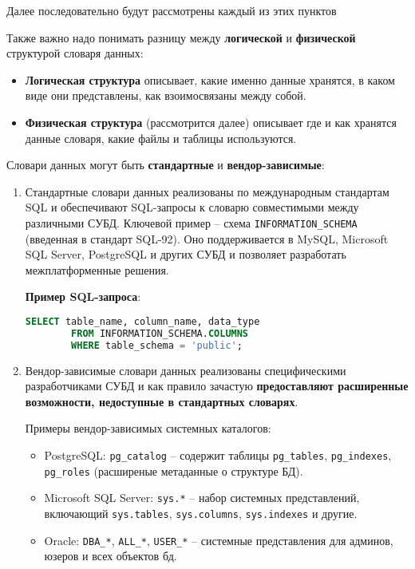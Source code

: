 Далее последовательно будут рассмотрены каждый из этих пунктов

Также важно надо понимать разницу между \textbf{логической} и \textbf{физической} структурой словаря данных:

\begin{itemize}
    \item \textbf{Логическая структура} описывает, какие именно данные хранятся, в каком виде они представлены, как взоимосвязаны между собой.
    \item \textbf{Физическая структура} (рассмотрится далее) описывает где и как хранятся данные словаря, какие файлы и таблицы используются.
\end{itemize}

Словари данных могут быть \textbf{стандартные} и \textbf{вендор-зависимые}:

\begin{enumerate}
 
    \item Стандартные словари данных реализованы по международным стандартам SQL и обеспечивают SQL-запросы к словарю совместимыми между различными СУБД. Ключевой пример – схема \texttt{INFORMATION\_SCHEMA} (введенная в стандарт SQL-92). Оно поддерживается в MySQL, Microsoft SQL Server, PostgreSQL и других СУБД и позволяет разработать межплатформенные решения.

        \textbf{Пример SQL-запроса}:
        \begin{lstlisting}[language=SQL]
        SELECT table_name, column_name, data_type 
        FROM INFORMATION_SCHEMA.COLUMNS 
        WHERE table_schema = 'public';
        \end{lstlisting}

    \item Вендор-зависимые словари данных реализованы специфическими разработчиками СУБД и как правило зачастую \textbf{предоставляют расширенные возможности, недоступные в стандартных словарях}. 

    Примеры вендор-зависимых системных каталогов:
    \begin{itemize}
        \item PostgreSQL: \texttt{pg\_catalog} – содержит таблицы \texttt{pg\_tables}, \texttt{pg\_indexes}, \texttt{pg\_roles} (расширеные метаданные о структуре БД).
        \item Microsoft SQL Server: \texttt{sys.*} – набор системных представлений, включающий \texttt{sys.tables}, \texttt{sys.columns}, \texttt{sys.indexes} и другие.
        \item Oracle: \texttt{DBA\_*}, \texttt{ALL\_*}, \texttt{USER\_*} – системные представления для админов, юзеров и всех объектов бд.
    \end{itemize}

\end{enumerate}

